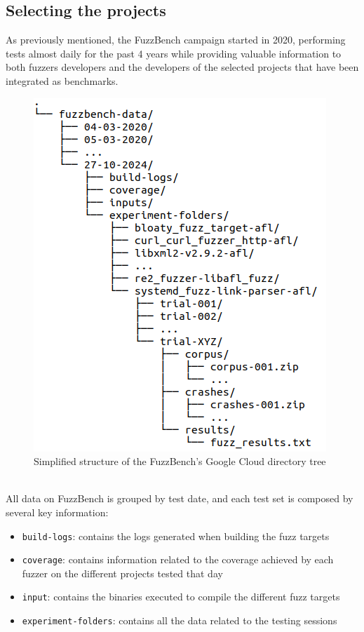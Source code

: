 \subsection{Selecting the projects}
As previously mentioned, the FuzzBench campaign started in 2020, performing tests almost daily for the past 4 years while providing valuable information to both fuzzers developers and the developers of the selected projects that have been integrated as benchmarks.
\begin{figure}[h]
\centering
\includegraphics[scale=0.4]{foto/tree.png}
\caption{Simplified structure of the FuzzBench's Google Cloud directory tree}
\label{fig:tree}
\end{figure}
\ \\
All data on FuzzBench is grouped by test date, and each test set is composed by several key information:
\begin{itemize}
    \item \verb|build-logs|: contains the logs generated when building the fuzz targets
    \item \verb|coverage|: contains information related to the coverage achieved by each fuzzer on the different projects tested that day
    \item \verb|input|: contains the binaries executed to compile the different fuzz targets
    \item \verb|experiment-folders|: contains all the data related to the testing sessions
\end{itemize}

